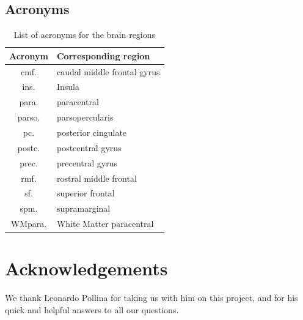 \documentclass[10pt,conference,compsocconf]{IEEEtran}
\begin{document}
\subsection{Acronyms}
\begin{table}[h!]
    \centering
    \begin{tabular}{| c | l |}
        \hline
        Acronym & Corresponding region \\
        \hline
        cmf. & caudal middle frontal gyrus \\
        ins. & Insula \\
        para. & paracentral \\
        parso. & parsopercularis \\
        pc. & posterior cingulate \\
        postc. & postcentral gyrus \\
        prec. & precentral gyrus \\
        rmf. & rostral middle frontal \\
        sf. & superior frontal \\
        spm. & supramarginal \\
        WMpara. & White Matter paracentral \\
        \hline
    \end{tabular}
    \caption{List of acronyms for the brain regions}
    \label{tab:acronyms}
\end{table}


\section*{Acknowledgements}
We thank Leonardo Pollina for taking us with him on this project, and for his quick and helpful answers to all our questions.



\end{document}
